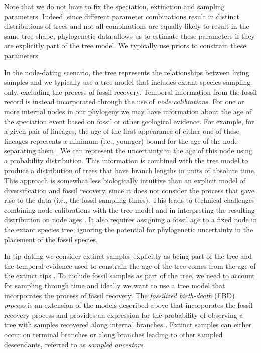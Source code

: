 Note that we do not have to fix the speciation, extinction and sampling parameters.
Indeed, since different parameter combinations result in distinct distributions of trees and not all combinations are equally likely to result in the same tree shape, phylogenetic data  allows us to estimate these parameters if they are explicitly part of the tree model.
We typically use priors to constrain these parameters.

In the node-dating scenario, the tree represents the relationships between living samples and we typically use a tree model that includes extant species sampling only, excluding the process of fossil recovery.
Temporal information from the fossil record is instead incorporated through the use of \textit{node calibrations}.
For one or more internal nodes in our phylogeny we may have information about the age of the speciation event based on fossil or other geological evidence.
For example, for a given pair of lineages, the age of the first appearance of either one of these lineages represents a minimum (i.e., younger) bound for the age of the node separating them \citep{Parham2012}.
We can represent the uncertainty in the age of this node using a probability distribution. %
This information is combined with the tree model to produce a distribution of trees that have branch lengths in units of absolute time.
This approach is somewhat less biologically intuitive than an explicit model of diversification and fossil recovery, since it does not consider the process that gave rise to the data (i.e., the fossil sampling times).
This leads to technical challenges combining node calibrations with the tree model and in interpreting the resulting distribution on node ages \citep{Heled2012,Warnock2015}.
It also requires assigning a fossil age to a fixed node in the extant species tree, ignoring the potential for phylogenetic uncertainty in the placement of the fossil species.

In tip-dating we consider extinct samples explicitly as being part of the tree and the temporal evidence used to constrain the age of the tree comes from the age of the extinct tips \citep{Ronquist2012a}.
To include fossil samples as part of the tree, we need to account for sampling through time and ideally we want to use a tree model that incorporates the process of fossil recovery.
The \textit{fossilized birth-death} (FBD) \textit{process} is an extension of the models described above that incorporates the fossil recovery process and provides an expression for the probability of observing a tree with samples recovered along internal branches \citep{Stadler2010,Heath2014,Gavryushkina2014}.
Extinct samples can either occur on terminal branches or along branches leading to other sampled descendants, referred to as \textit{sampled ancestors}.

